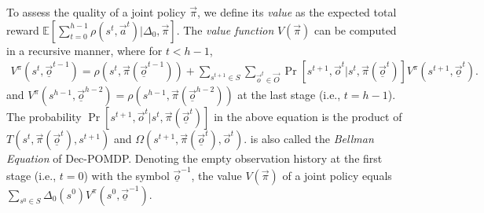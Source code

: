 To assess the quality of a joint policy $\vec{\pi}$,
we define its \textit{value} as the expected total reward
$\mathbb{E}[\sum_{t=0}^{h-1}\rho(s^t,\vec{a}^t)|\Delta_0,\vec{\pi}]$.
The \textit{value function} $V(\vec{\pi})$ can be computed in a recursive manner,
where for $t<h-1$,
\begin{align}\label{eq:bellman}
    V^\pi(s^t,\vec{\underline{o}}^{t-1})=\rho(s^t,\vec{\pi}(\vec{\underline{o}}^{t-1}))+
    \sum_{s^{t+1}\in S}\sum_{\vec{o}^t\in\vec{O}}\Pr[s^{t+1},\vec{o}^t|s^t,\vec{\pi}(\vec{\underline{o}}^t)]V^\pi(s^{t+1},\vec{\underline{o}}^{t}).
\end{align}
and $V^\pi(s^{h-1},\vec{\underline{o}}^{h-2})=\rho(s^{h-1},\vec{\pi}(\vec{\underline{o}}^{h-2}))$ at the last stage (i.e., $t=h-1$).
The probability $\Pr[s^{t+1},\vec{o}^{t}|s^t,\vec{\pi}(\vec{\underline{o}}^t)]$ in the above equation is the product of $T(s^t,\vec{\pi}(\vec{\underline{o}}^t),s^{t+1})$ and $\Omega(s^{t+1},\vec{\pi}(\vec{\underline{o}}^t),\vec{o}^{t})$.
 is also called the \textit{Bellman Equation} of Dec-POMDP.
Denoting the empty observation history at the first stage (i.e., $t=0$) with the symbol $\vec{\underline{o}}^{-1}$, the value $V(\vec{\pi})$ of a joint policy equals $\sum_{s^0\in S}\Delta_0(s^0)V^\pi(s^0,\vec{\underline{o}}^{-1})$.